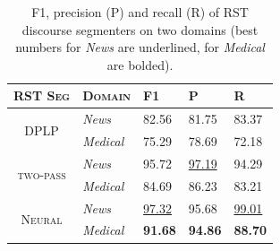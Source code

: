 \begin{table}[t]
\centering
\begin{tabular}{cllll}
\toprule
\multicolumn{1}{l}{\textsc{RST Seg}} & \textsc{Domain}  & \textsc{F1}     & \textsc{P}     & \textsc{R}    \\ 
\midrule
\multirow{2}{*}{\textsc{DPLP}}              & \textit{News}    & 82.56 & 81.75 & 83.37 \\
& \textit{Medical} & 75.29 & 78.69 & 72.18 \\
\midrule
\multirow{2}{*}{\textsc{two-pass}}              & \textit{News}    & 95.72 & \underline{97.19} & 94.29 \\
& \textit{Medical} & 84.69 &86.23 & 83.21 \\
\midrule
\multirow{2}{*}{\textsc{Neural}}              & \textit{News}    & \underline{97.32} & 95.68 & \underline{99.01} \\
& \textit{Medical} & \textbf{91.68} & \textbf{94.86} & \textbf{88.70} \\\bottomrule
\end{tabular}
\vspace{-0.6em}
\caption{F1, precision (P) and recall (R) of RST discourse segmenters on two domains (best numbers for \textit{News} are underlined, for \textit{Medical} are bolded).}
\label{tab:cross_domain_f1}
\end{table}

